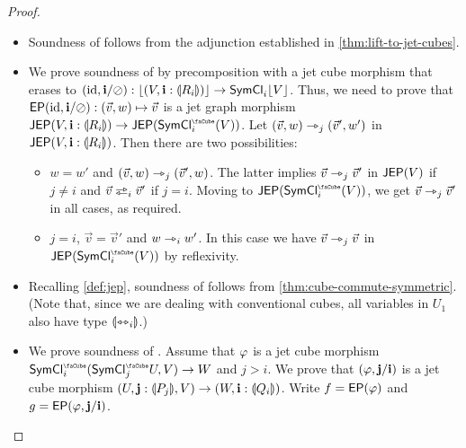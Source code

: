 \documentclass[a4paper]{memoir}
\begin{document}
\begin{proof}
\begin{itemize}
		\item Soundness of  follows from the adjunction established in \cref{thm:lift-to-jet-cubes}.
		
		\item We prove soundness of  by precomposition with a jet cube morphism that erases to $(\mathrm{id}, \mathbf{i} / \oslash) : \mathopen{}\left\lfloor (V, \mathbf{i} : {\llparenthesis R_i \rrparenthesis}) \right\rfloor\mathclose{} \to \mathsf{SymCl}_i \mathopen{}\left\lfloor V \right\rfloor\mathclose{}$.
		Thus, we need to prove that $\mathsf{EP}(\mathrm{id}, \mathbf{i} / \oslash) : (\vec v, w) \mapsto \vec v$ is a jet graph morphism $\JEP(V, \dm i : \rival{R_i})
		\to \JEP(\UFsymcube_i(V))$.
		Let $(\vec v, w) \rightarrowtriangle_j (\vec v', w')$ in $\mathsf{JEP}(V, \mathbf{i} : {\llparenthesis R_i \rrparenthesis})$.
		Then there are two possibilities:
		\begin{itemize}
			\item $w = w'$ and $(\vec v, w) \rightarrowtriangle_j (\vec v', w)$. The latter implies $\vec v \rightarrowtriangle_j \vec v'$ in $\mathsf{JEP}(V)$ if $j \neq i$ and $\vec v \infrajet_i \vec v'$ if $j = i$. Moving to $\JEP(\UFsymcube_i(V))$, we get $\vec v \rightarrowtriangle_j \vec v'$ in all cases, as required.
			\item $j = i$, $\vec v = \vec v'$ and $w \rightarrowtriangle_i w'$. In this case we have $\vec v \rightarrowtriangle_j \vec v$ in $\JEP(\UFsymcube_i(V))$ by reflexivity.
		\end{itemize}
		
		\item Recalling \cref{def:jep}, soundness of  follows from \cref{thm:cube-commute-symmetric}.
		(Note that, since we are dealing with conventional cubes, all variables in $U_1$ also have type ${\llparenthesis \leftrightarrowtriangle_i \rrparenthesis}$.)
		
		\item We prove soundness of .
		Assume that $\varphi$ is a jet cube morphism $\UFsymcube_i(\UFsymcube_j U, V) \to W$ and $j > i$.
		We prove that $(\varphi, \mathbf{j} / \mathbf{i})$ is a jet cube morphism $(U, \mathbf{j} : {\llparenthesis P_j \rrparenthesis}, V) \to (W, \mathbf{i} : {\llparenthesis Q_i \rrparenthesis})$.
		Write $f = \mathsf{EP}(\varphi)$ and $g = \mathsf{EP}(\varphi, \mathbf{j} / \mathbf{i})$.
		

\end{itemize}
\end{proof}
\end{document}
